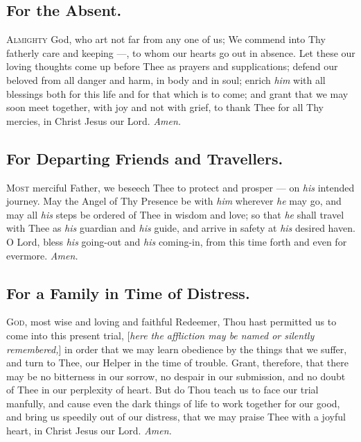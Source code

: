 \subsection*{For the Absent.} 

\lettrine{A}{lmighty} God, who art not far from any one of us;
We commend into Thy fatherly care and keeping ---,
to whom our hearts go out in absence. Let these our loving thoughts come up before Thee as prayers and supplications; defend our beloved from all danger and harm, in
body and in soul; enrich \textit{him} with all blessings both for
this life and for that which is to come; and grant that we
may soon meet together, with joy and not with grief, to
thank Thee for all Thy mercies, in Christ Jesus our Lord.
\textit{Amen.} \\

\subsection*{For Departing Friends and Travellers.}

\lettrine{M}{ost} merciful Father, we beseech Thee to protect and prosper --- on \textit{his} intended journey.
May the Angel of Thy Presence be with \textit{him} wherever \textit{he} may go, and may all \textit{his} steps be ordered of Thee in wisdom and love;
so that \textit{he} shall travel with Thee as \textit{his} guardian and \textit{his} guide, and arrive in safety at \textit{his} desired haven.
O Lord, bless \textit{his} going-out and \textit{his} coming-in, from this time forth and even for evermore.
\textit{Amen.} \\

\subsection*{For a Family in Time of Distress.}

\lettrine{G}{od,} most wise and loving and faithful Redeemer,
Thou hast permitted us to come into this present trial,
[\textit{here the affliction may be named or silently remembered,}]
in order that we may learn obedience by the things that we
suffer, and turn to Thee, our Helper in the time of trouble.
Grant, therefore, that there may be no bitterness in our
sorrow, no despair in our submission, and no doubt of Thee
in our perplexity of heart. But do Thou teach us to face
our trial manfully, and cause even the dark things of life
to work together for our good, and bring us speedily out
of our distress, that we may praise Thee with a joyful
heart, in Christ Jesus our Lord.
\textit{Amen.} \\

